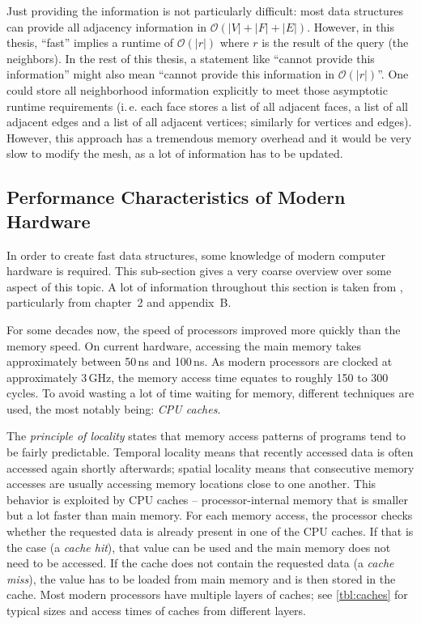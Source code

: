 Just providing the information is not particularly difficult:
most data structures can provide all adjacency information in $\mathcal O(|V| + |F| + |E|)$.
However, in this thesis, \enquote{fast} implies a runtime of $\mathcal O(|r|)$ where $r$ is the result of the query (the neighbors). In the rest of this thesis, a statement like \enquote{cannot provide this information} might also mean \enquote{cannot provide this information in $\mathcal O(|r|)$}.
One could store all neighborhood information explicitly to meet those asymptotic runtime requirements (i.\,e. each face stores a list of all adjacent faces, a list of all adjacent edges and a list of all adjacent vertices; similarly for vertices and edges).
However, this approach has a tremendous memory overhead and it would be very slow to modify the mesh, as a lot of information has to be updated.


\subsection{Performance Characteristics of Modern Hardware}

In order to create fast data structures, some knowledge of modern computer hardware is required.
This sub-section gives a very coarse overview over some aspect of this topic.
A lot of information throughout this section is taken from \cite{hennessy2017computer}, particularly from chapter~2 and appendix~B.

For some decades now, the speed of processors improved more quickly than the memory speed.
On current hardware, accessing the main memory takes approximately between 50\,ns and 100\,ns.
As modern processors are clocked at approximately 3\,GHz, the memory access time equates to roughly 150 to 300 cycles.
To avoid wasting a lot of time waiting for memory, different techniques are used, the most notably being: \emph{CPU caches}.

The \emph{principle of locality} states that memory access patterns of programs tend to be fairly predictable.
Temporal locality means that recently accessed data is often accessed again shortly afterwards;
spatial locality means that consecutive memory accesses are usually accessing memory locations close to one another.
This behavior is exploited by CPU caches -- processor-internal memory that is smaller but a lot faster than main memory.
For each memory access, the processor checks whether the requested data is already present in one of the CPU caches.
If that is the case (a \emph{cache hit}), that value can be used and the main memory does not need to be accessed.
If the cache does not contain the requested data (a \emph{cache miss}), the value has to be loaded from main memory and is then stored in the cache.
Most modern processors have multiple layers of caches; see \ref{tbl:caches} for typical sizes and access times of caches from different layers.

